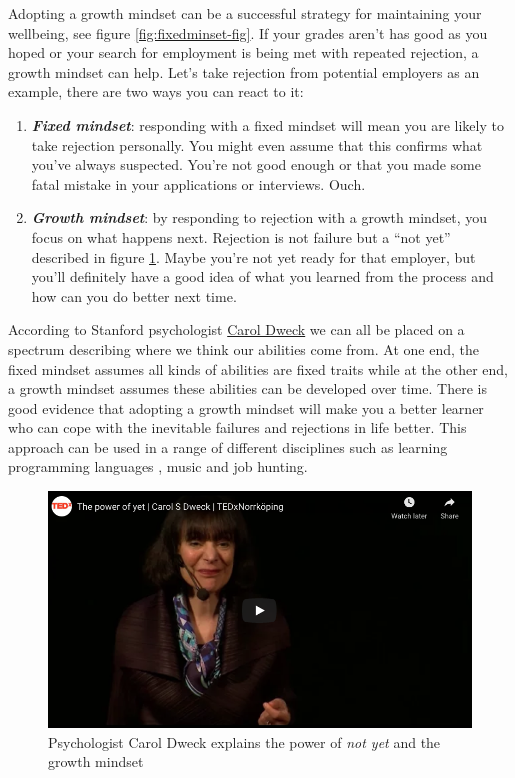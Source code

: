 \documentclass[
]{book}
\providecommand{\tightlist}{%
  \setlength{\itemsep}{0pt}\setlength{\parskip}{0pt}}
\begin{document}
Adopting a growth mindset can be a successful strategy for maintaining your wellbeing, see figure \ref{fig:fixedminset-fig}. If your grades aren't has good as you hoped or your search for employment is being met with repeated rejection, a growth mindset can help. Let's take rejection from potential employers as an example, there are two ways you can react to it:

\begin{enumerate}
\def\labelenumi{\arabic{enumi}.}
\tightlist
\item
  \textbf{\emph{Fixed mindset}}: responding with a fixed mindset will mean you are likely to take rejection personally. You might even assume that this confirms what you've always suspected. You're not good enough or that you made some fatal mistake in your applications or interviews. Ouch.
\item
  \textbf{\emph{Growth mindset}}: by responding to rejection with a growth mindset, you focus on what happens next. Rejection is not failure but a ``not yet'' described in figure \ref{fig:not-fig}. Maybe you're not yet ready for that employer, but you'll definitely have a good idea of what you learned from the process and how can you do better next time.
\end{enumerate}

According to Stanford psychologist \href{https://en.wikipedia.org/wiki/Carol_Dweck}{Carol Dweck} we can all be placed on a spectrum describing where we think our abilities come from. At one end, the fixed mindset assumes all kinds of abilities are fixed traits while at the other end, a growth mindset assumes these abilities can be developed over time. \citep{dweck} There is good evidence that adopting a growth mindset will make you a better learner who can cope with the inevitable failures and rejections in life better. This approach can be used in a range of different disciplines such as learning programming languages \citep{Cutts2010}, music \citep{Davis2016} and job hunting.

\begin{figure}

{\centering \includegraphics[width=0.99\linewidth]{images/youtube-dweck} 

}

\caption{Psychologist Carol Dweck explains the power of \emph{not yet} and the growth mindset \citep{youtube-dweck}}\label{fig:not-fig}
\end{figure}
\end{document}
